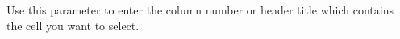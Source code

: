 Use this parameter to enter the column number or header title which contains the cell you want to select.

